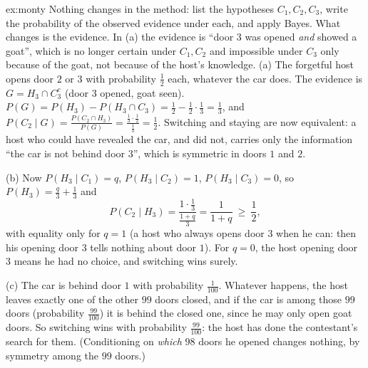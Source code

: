 \begin{solution}{ex:monty}
\idea Nothing changes in the method: list the hypotheses $C_1,C_2,C_3$, write the probability of the observed evidence under each, and apply Bayes. What changes is the evidence. In (a) the evidence is ``door $3$ was opened \emph{and} showed a goat'', which is no longer certain under $C_1,C_2$ and impossible under $C_3$ only because of the goat, not because of the host's knowledge.
\writeup (a) The forgetful host opens door $2$ or $3$ with probability $\frac12$ each, whatever the car does. The evidence is $G=H_3\cap C_3^c$ (door $3$ opened, goat seen). $P(G)=P(H_3)-P(H_3\cap C_3)=\frac12-\frac12\cdot\frac13=\frac13$, and $P(C_2\mid G)=\frac{P(C_2\cap H_3)}{P(G)}=\frac{\frac13\cdot\frac12}{\frac13}=\frac12$. Switching and staying are now equivalent: a host who could have revealed the car, and did not, carries only the information ``the car is not behind door $3$'', which is symmetric in doors $1$ and $2$.

(b) Now $P(H_3\mid C_1)=q$, $P(H_3\mid C_2)=1$, $P(H_3\mid C_3)=0$, so $P(H_3)=\frac q3+\frac13$ and
\[
P(C_2\mid H_3)=\frac{1\cdot\frac13}{\frac{1+q}3}=\frac1{1+q}\ \ge\ \frac12 ,
\]
with equality only for $q=1$ (a host who always opens door $3$ when he can: then his opening door $3$ tells nothing about door $1$). For $q=0$, the host opening door $3$ means he had no choice, and switching wins surely.

(c) The car is behind door $1$ with probability $\frac1{100}$. Whatever happens, the host leaves exactly one of the other $99$ doors closed, and if the car is among those $99$ doors (probability $\frac{99}{100}$) it is behind the closed one, since he may only open goat doors. So switching wins with probability $\frac{99}{100}$: the host has done the contestant's search for them. (Conditioning on \emph{which} $98$ doors he opened changes nothing, by symmetry among the $99$ doors.)
\end{solution}

